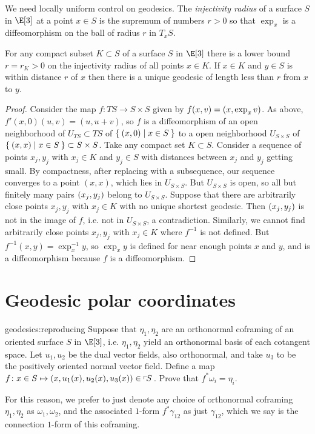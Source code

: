 We need locally uniform control on geodesics.
The \emph{injectivity radius} of a surface \(S\) in \(\E[3]\) at a point \(x \in S\) is the supremum of numbers \(r > 0\) so that \(\exp_x\) is a diffeomorphism on the ball of radius \(r\) in \(T_x S\).
\begin{lemma}\label{lemma:bound.inj.radius}
 For any compact subset \(K \subset S\) of a surface \(S\) in \(\E[3]\) there is a lower bound \(r=r_K > 0\) on the injectivity radius of all points \(x \in K\).
If \(x \in K\) and \(y \in S\) is within distance \(r\) of \(x\) then there is a unique geodesic of length less than \(r\) from \(x\) to \(y\).
\end{lemma}
\begin{proof}
Consider the map \(f \colon TS \to S \times S\) given by \(f(x,v)=\left(x,\exp_x v\right)\).
As above, \(f'(x,0)(u,v)=(u,u+v)\), so \(f\) is a diffeomorphism of an open neighborhood of \(U_{TS} \subset TS\) of \(\Set{(x,0)|x \in S}\) to a open neighborhood \(U_{S \times S}\) of \(\Set{(x,x)|x \in S} \subset S \times S\).
Take any compact set \(K \subset S\).
Consider a sequence of points \(x_j, y_j\) with \(x_j \in K\) and \(y_j \in S\) with distances between \(x_j\) and \(y_j\) getting small.
By compactness, after replacing with a subsequence, our sequence converges to a point \((x,x)\), which lies in \(U_{S \times S}\).
But \(U_{S \times S}\) is open, so all but finitely many pairs \(\left(x_j,y_j\right)\) belong to \(U_{S \times S}\).
Suppose that there are arbitrarily close points \(x_j, y_j\) with \(x_j \in K\) with no unique shortest geodesic.
Then \(\left(x_j,y_j\right)\) is not in the image of \(f\), i.e. not in \(U_{S \times S}\), a contradiction.
Similarly, we cannot find arbitrarily close points \(x_j, y_j\) with \(x_j \in K\) where \(f^{-1}\) is not defined.
But \(f^{-1}(x,y)=\exp_x^{-1} y\), so \(\exp_x y\) is defined for near enough points \(x\) and \(y\), and is a diffeomorphism because \(f\) is a diffeomorphism.
\end{proof}


\section{Geodesic polar coordinates}
\begin{problem}{geodesics:reproducing}
Suppose that \(\eta_1,\eta_2\) are an orthonormal coframing of an oriented surface \(S\) in \(\E[3]\), i.e. \(\eta_1,\eta_2\) yield an orthonormal basis of each cotangent space.
Let \(u_1, u_2\) be the dual vector fields, also orthonormal, and take \(u_3\) to be the positively oriented normal vector field.
Define a map \(f \colon x \in S \mapsto (x,u_1(x),u_2(x),u_3(x)) \in \left\ulcorner\!S\right.\).
Prove that \(f^* \omega_i = \eta_i\).
\end{problem}
For this reason, we prefer to just denote any choice of orthonormal coframing \(\eta_1,\eta_2\) as \(\omega_1,\omega_2\), and the associated \(1\)-form \(f^*\gamma_{12}\) as just \(\gamma_{12}\), which we say is the connection \(1\)-form of this coframing.

